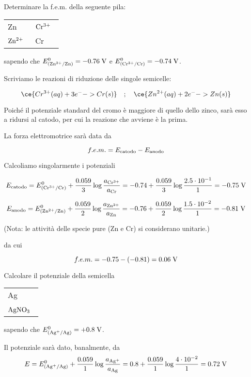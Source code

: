 \begin{esercizio}
    Determinare la f.e.m. della seguente pila:
    \begin{center}
        \begin{tabular}{|p{3.7cm}||p{3.7cm}|}
             Zn & $\rm Cr^{3+}$ \, \\[0.5ex]
             $\rm Zn^{2+}$ \,  & Cr\\[0.5ex]
        \end{tabular}
    \end{center}
    sapendo che $E^{0}_{(\rm Zn^{2+}/Zn)}=-0.76 \; \rm V$ e $E^{0}_{(\rm Cr^{3+}/Cr)}=-0.74 \; \rm V$.
\end{esercizio}
\begin{soluzione}
    Scriviamo le reazioni di riduzione delle singole semicelle:

$$\ce{Cr^{3+}(aq) + 3 e^- -> Cr(s)}
\quad;\quad
\ce{Zn^{2+}(aq) + 2 e^- -> Zn(s)}$$

Poiché il potenziale standard del cromo è maggiore di quello dello zinco, sarà esso a ridursi al catodo, per cui la reazione che avviene è la prima.

La forza elettromotrice sarà data da

$$f.e.m. = E_{\rm catodo} - E_{\rm anodo}$$

Calcoliamo singolarmente i potenziali

$$E_{\rm catodo}
=E^0_{(\rm Cr^{3+}/Cr)} + \frac{0.059}{3} \log \frac{a_{\rm Cr^{3+}}}{a_{\rm Cr}}
=-0.74 + \frac{0.059}{3} \log \frac{2.5 \cdot 10^{-1}}{1}
=-0.75 \; \rm V$$

$$E_{\rm anodo} = E^0_{(\rm Zn^{2+}/Zn)} + \frac{0.059}{2} \log \frac{a_{\rm Zn^{2+}}}{a_{\rm Zn}}
=-0.76 + \frac{0.059}{2} \log \frac{1.5 \cdot 10^{-2}}{1}
=-0.81 \; \rm V$$

(Nota: le attività delle specie pure (Zn e Cr) si considerano unitarie.)

da cui

$$f.e.m.=-0.75 - (-0.81) = 0.06 \; \rm V$$
\end{soluzione}

\newpage

\begin{esercizio}
    Calcolare il potenziale della semicella

\begin{center}
    \begin{tabular}{|p{3.7cm}|}
         Ag\\[0.5ex]
         $\rm AgNO_3$ \, \\[0.5ex]
    \end{tabular}
\end{center}

sapendo che $E^{0}_{(\rm Ag^{+}/Ag)}=+0.8 \; \rm V$.
\end{esercizio}
\begin{soluzione}
    Il potenziale sarà dato, banalmente, da
    $$E = E^0_{(\rm Ag^{+}/Ag)} + \frac{0.059}{1} \log \frac{a_{\rm Ag^{+}}}{a_{\rm Ag}}
    =0.8 + \frac{0.059}{1} \log \frac{4 \cdot 10^{-2}}{1}
    =0.72 \; \rm V$$
\end{soluzione}

